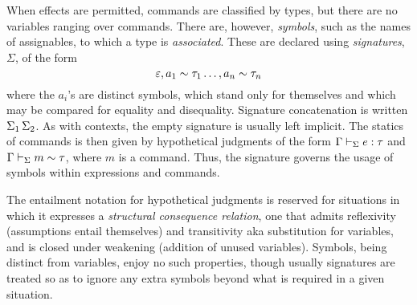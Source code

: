 \documentclass[11pt]{article}
\begin{document}
When effects are permitted, commands are classified by types, but there are no variables ranging over commands.  There are, however, \emph{symbols}, such as the names of assignables, to which a type is \emph{associated}.  These are declared using \emph{signatures}, $\Sigma$, of the form
\[
    \extSig{\extSig{\empSig}{\hasTp{a_1}{\tau_1}}\dots}{\hasTp{a_n}{\tau_n}}
\]
where the $a_i$'s are distinct symbols, which stand only for themselves and which may be compared for equality and disequality.  Signature concatenation is written $\Sigma_1\,\Sigma_2$.  As with contexts, the empty signature is usually left implicit.  The statics of commands is then given by hypothetical judgments of the form $\Gamma\entailsJ[\Sigma] \isOf{e}{\tau}$ and $\Gamma\entailsJ[\Sigma] \hasTp{m}{\tau}$, where $m$ is a command.  Thus, the signature governs the usage of symbols within expressions and commands.

\smallskip

The entailment notation for hypothetical judgments is reserved for situations in which it expresses a \emph{structural consequence relation}, one that admits reflexivity (assumptions entail themselves) and transitivity aka substitution for variables, and is closed under weakening (addition of unused variables).  Symbols, being distinct from variables, enjoy no such properties, though usually signatures are treated so as to ignore any extra symbols beyond what is required in a given situation.
\end{document}
